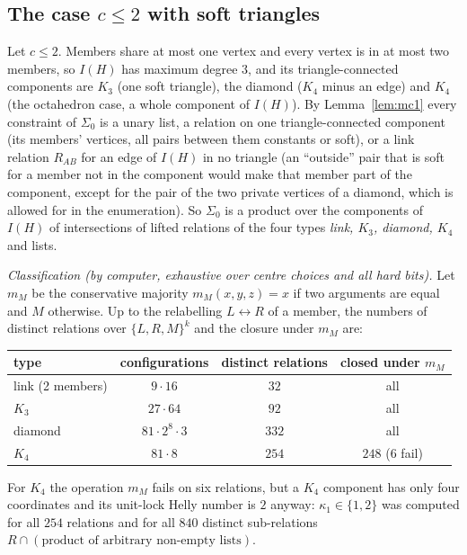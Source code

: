 \subsection{The case \texorpdfstring{$c\le2$}{c<=2} with soft triangles}
Let $c\le2$. Members share at most one vertex and every vertex is in at most two members, so $I(H)$ has maximum degree $3$, and its triangle-connected components are $K_3$ (one soft triangle), the diamond ($K_4$ minus an edge) and $K_4$ (the octahedron case, a whole component of $I(H)$). By Lemma~\ref{lem:mc1} every constraint of $\Sigma_0$ is a unary list, a relation on one triangle-connected component (its members' vertices, all pairs between them constants or soft), or a link relation $R_{AB}$ for an edge of $I(H)$ in no triangle (an ``outside'' pair that is soft for a member not in the component would make that member part of the component, except for the pair of the two private vertices of a diamond, which is allowed for in the enumeration). So $\Sigma_0$ is a product over the components of $I(H)$ of intersections of lifted relations of the four types \emph{link, $K_3$, diamond, $K_4$} and lists.

\emph{Classification (by computer, exhaustive over centre choices and all hard bits).} Let $m_M$ be the conservative majority $m_M(x,y,z)=x$ if two arguments are equal and $M$ otherwise. Up to the relabelling $L\leftrightarrow R$ of a member, the numbers of distinct relations over $\{L,R,M\}^k$ and the closure under $m_M$ are:
\begin{center}\small
\begin{tabular}{@{}lccc@{}}\hline
type & configurations & distinct relations & closed under $m_M$\\\hline
link (2 members) & $9\cdot16$ & $32$ & all\\
$K_3$ & $27\cdot64$ & $92$ & all\\
diamond & $81\cdot2^8\cdot3$ & $332$ & all\\
$K_4$ & $81\cdot8$ & $254$ & $248$ ($6$ fail)\\\hline
\end{tabular}
\end{center}
For $K_4$ the operation $m_M$ fails on six relations, but a $K_4$ component has only four coordinates and its unit-lock Helly number is $2$ anyway: $\kappa_1\in\{1,2\}$ was computed for all $254$ relations and for all $840$ distinct sub-relations $R\cap(\text{product of arbitrary non-empty lists})$.

